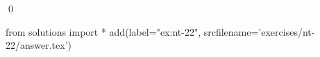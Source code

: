 
\begin{ex} 
  \label{ex:nt-22}
  
  \qed
\end{ex} 
\begin{python0}
from solutions import *
add(label="ex:nt-22",
    srcfilename='exercises/nt-22/answer.tex') 
\end{python0}
